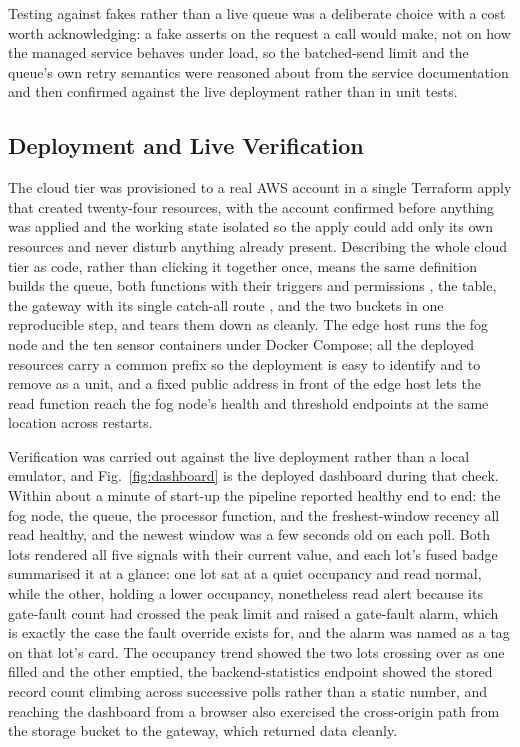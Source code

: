 \documentclass[conference]{IEEEtran}
\begin{document}
Testing against fakes rather than a live queue was a deliberate choice with a cost worth acknowledging: a fake asserts on the request a call would make, not on how the managed service behaves under load, so the batched-send limit and the queue's own retry semantics were reasoned about from the service documentation \cite{awssqs} and then confirmed against the live deployment rather than in unit tests.

\subsection{Deployment and Live Verification}

The cloud tier was provisioned to a real AWS account in a single Terraform apply that created twenty-four resources, with the account confirmed before anything was applied and the working state isolated so the apply could add only its own resources and never disturb anything already present. Describing the whole cloud tier as code, rather than clicking it together once, means the same definition builds the queue, both functions with their triggers and permissions \cite{awslambda}, the table, the gateway with its single catch-all route \cite{awsapigw}, and the two buckets in one reproducible step, and tears them down as cleanly. The edge host runs the fog node and the ten sensor containers under Docker Compose; all the deployed resources carry a common prefix so the deployment is easy to identify and to remove as a unit, and a fixed public address in front of the edge host lets the read function reach the fog node's health and threshold endpoints at the same location across restarts.

Verification was carried out against the live deployment rather than a local emulator, and Fig.~\ref{fig:dashboard} is the deployed dashboard during that check. Within about a minute of start-up the pipeline reported healthy end to end: the fog node, the queue, the processor function, and the freshest-window recency all read healthy, and the newest window was a few seconds old on each poll. Both lots rendered all five signals with their current value, and each lot's fused badge summarised it at a glance: one lot sat at a quiet occupancy and read normal, while the other, holding a lower occupancy, nonetheless read alert because its gate-fault count had crossed the peak limit and raised a gate-fault alarm, which is exactly the case the fault override exists for, and the alarm was named as a tag on that lot's card. The occupancy trend showed the two lots crossing over as one filled and the other emptied, the backend-statistics endpoint showed the stored record count climbing across successive polls rather than a static number, and reaching the dashboard from a browser also exercised the cross-origin path from the storage bucket to the gateway, which returned data cleanly.
\end{document}
